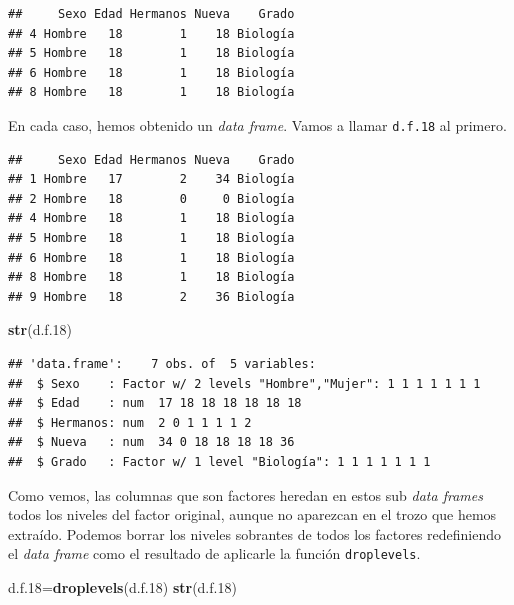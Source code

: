 \documentclass[]{book}
\newenvironment{Shaded}{\begin{snugshade}}{\end{snugshade}}
\newcommand{\DecValTok}[1]{\textcolor[rgb]{0.00,0.00,0.81}{#1}}
\newcommand{\FloatTok}[1]{\textcolor[rgb]{0.00,0.00,0.81}{#1}}
\newcommand{\KeywordTok}[1]{\textcolor[rgb]{0.13,0.29,0.53}{\textbf{#1}}}
\newcommand{\NormalTok}[1]{#1}
\newcommand{\OperatorTok}[1]{\textcolor[rgb]{0.81,0.36,0.00}{\textbf{#1}}}
\theoremstyle{definition}
\theoremstyle{definition}
\theoremstyle{definition}
\theoremstyle{remark}
\begin{document}
\begin{verbatim}
##     Sexo Edad Hermanos Nueva    Grado
## 4 Hombre   18        1    18 Biología
## 5 Hombre   18        1    18 Biología
## 6 Hombre   18        1    18 Biología
## 8 Hombre   18        1    18 Biología
\end{verbatim}

En cada caso, hemos obtenido un \emph{data frame}. Vamos a llamar \texttt{d.f.18} al primero.

\begin{Shaded}
\end{Shaded}

\begin{verbatim}
##     Sexo Edad Hermanos Nueva    Grado
## 1 Hombre   17        2    34 Biología
## 2 Hombre   18        0     0 Biología
## 4 Hombre   18        1    18 Biología
## 5 Hombre   18        1    18 Biología
## 6 Hombre   18        1    18 Biología
## 8 Hombre   18        1    18 Biología
## 9 Hombre   18        2    36 Biología
\end{verbatim}

\begin{Shaded}
\begin{Highlighting}[]
\KeywordTok{str}\NormalTok{(d.f}\FloatTok{.18}\NormalTok{)}
\end{Highlighting}
\end{Shaded}

\begin{verbatim}
## 'data.frame':    7 obs. of  5 variables:
##  $ Sexo    : Factor w/ 2 levels "Hombre","Mujer": 1 1 1 1 1 1 1
##  $ Edad    : num  17 18 18 18 18 18 18
##  $ Hermanos: num  2 0 1 1 1 1 2
##  $ Nueva   : num  34 0 18 18 18 18 36
##  $ Grado   : Factor w/ 1 level "Biología": 1 1 1 1 1 1 1
\end{verbatim}

Como vemos, las columnas que son factores heredan en estos sub \emph{data frames} todos los niveles del factor original, aunque no aparezcan en el trozo que hemos extraído. Podemos borrar los niveles sobrantes de todos los factores redefiniendo el \emph{data frame} como el resultado de aplicarle la función
\texttt{droplevels}.

\begin{Shaded}
\begin{Highlighting}[]
\NormalTok{d.f}\FloatTok{.18}\NormalTok{=}\KeywordTok{droplevels}\NormalTok{(d.f}\FloatTok{.18}\NormalTok{)}
\KeywordTok{str}\NormalTok{(d.f}\FloatTok{.18}\NormalTok{)}
\end{Highlighting}
\end{Shaded}
\end{document}

